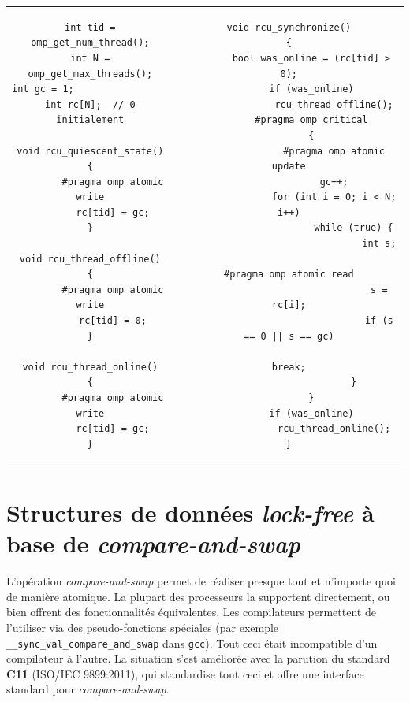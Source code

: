 \begin{tabular}{c|c}
\begin{minipage}[t]{0.35\textwidth}
\begin{verbatim}
int tid = omp_get_num_thread();
int N = omp_get_max_threads();
int gc = 1;                      
int rc[N];  // 0 initialement

void rcu_quiescent_state()
{
        #pragma omp atomic write
        rc[tid] = gc;
}

void rcu_thread_offline()
{
        #pragma omp atomic write
        rc[tid] = 0;
}

void rcu_thread_online()
{
        #pragma omp atomic write
        rc[tid] = gc;
}
\end{verbatim}
\end{minipage}
&
\begin{minipage}[t]{0.6\textwidth}
\begin{verbatim}
void rcu_synchronize()
{
        bool was_online = (rc[tid] > 0);
        if (was_online)
                rcu_thread_offline();
        #pragma omp critical
        {
                #pragma omp atomic update
                gc++;
                for (int i = 0; i < N; i++)
                       while (true) {
                                int s;
                                #pragma omp atomic read
                                s = rc[i];
                                if (s == 0 || s == gc)
                                        break;
                       }
        }
        if (was_online)
                rcu_thread_online();
}
\end{verbatim}
\end{minipage}
\end{tabular}

\section{Structures de données \emph{lock-free} à base de \emph{compare-and-swap}}

L'opération \og \emph{compare-and-swap}\fg{} permet de réaliser presque tout et
n'importe quoi de manière atomique. La plupart des processeurs la supportent
directement, ou bien offrent des fonctionnalités équivalentes. Les compilateurs
permettent de l'utiliser via des pseudo-fonctions spéciales (par exemple
\texttt{\_\_sync\_val\_compare\_and\_swap} dans \texttt{gcc}). Tout ceci était
incompatible d'un compilateur à l'autre. La situation s'est améliorée avec la
parution du standard \textbf{C11} (ISO/IEC 9899:2011), qui standardise tout ceci
et offre une interface standard pour \emph{compare-and-swap}.

